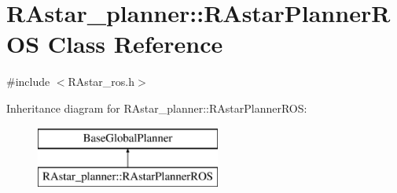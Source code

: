 \hypertarget{classRAstar__planner_1_1RAstarPlannerROS}{\section{R\-Astar\-\_\-planner\-:\-:R\-Astar\-Planner\-R\-O\-S Class Reference}
\label{classRAstar__planner_1_1RAstarPlannerROS}
}


{\ttfamily \#include $<$R\-Astar\-\_\-ros.\-h$>$}

Inheritance diagram for R\-Astar\-\_\-planner\-:\-:R\-Astar\-Planner\-R\-O\-S\-:\begin{figure}[H]
\begin{center}
\leavevmode
\includegraphics[height=2.000000cm]{db/dde/classRAstar__planner_1_1RAstarPlannerROS}
\end{center}
\end{figure}
